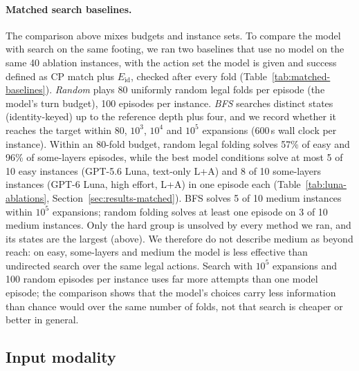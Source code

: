 \paragraph{Matched search baselines.} The comparison above mixes budgets and instance sets. To
compare the model with search on the same footing, we ran two baselines that use no model on the
same 40 ablation instances, with the action set the model is given and success defined as CP match
plus $E_{\mathrm{id}}$, checked after every fold (Table~\ref{tab:matched-baselines}). \emph{Random}
plays 80 uniformly random legal folds per episode (the model's turn budget), 100 episodes per
instance. \emph{BFS} searches distinct states (identity-keyed) up to the reference depth plus four,
and we record whether it reaches the target within 80, $10^3$, $10^4$ and $10^5$ expansions (600\,s
wall clock per instance). Within an 80-fold budget, random legal folding solves 57\% of easy and 96\%
of some-layers episodes, while the best model conditions solve at most 5 of 10 easy instances
(GPT-5.6 Luna, text-only L+A) and 8 of 10 some-layers instances (GPT-6 Luna, high effort, L+A)
in one episode each (Table~\ref{tab:luna-ablations}, Section~\ref{sec:results-matched}).
BFS solves 5 of 10 medium instances within $10^5$ expansions; random folding solves at least one
episode on 3 of 10 medium instances. Only the hard group is unsolved by every method we ran, and
its states are the largest (above). We therefore do not describe medium as beyond reach: on easy,
some-layers and medium the model is less effective than undirected search over the same legal
actions. Search with $10^5$ expansions and 100 random episodes per instance uses far more
attempts than one model episode; the comparison shows that the model's choices carry less
information than chance would over the same number of folds, not that search is cheaper or
better in general.



\subsection{Input modality}



